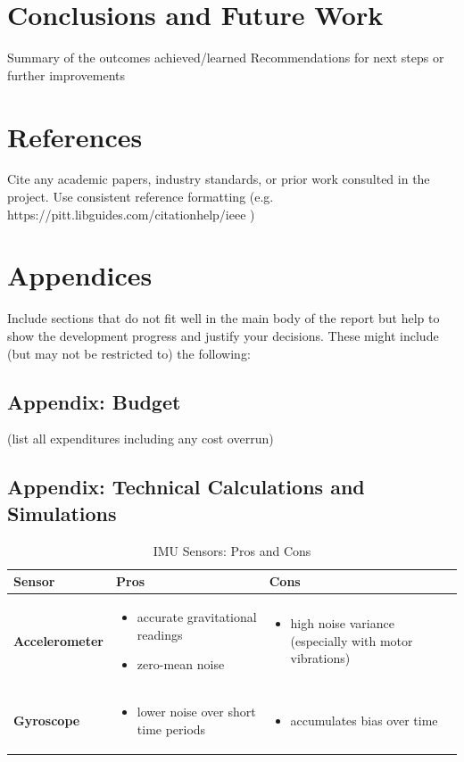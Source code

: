 \documentclass{article}
\begin{document}
\section{Conclusions and Future Work}
Summary of the outcomes achieved/learned
Recommendations for next steps or further improvements


\section{References}
Cite any academic papers, industry standards, or prior work consulted in the project. Use consistent reference
formatting (e.g. https://pitt.libguides.com/citationhelp/ieee )


\section{Appendices}
Include sections that do not fit well in the main body of the report but help to show the development progress and justify your decisions. These might include (but may not be restricted to) the following:
\subsection{Appendix: Budget} (list all expenditures including any cost overrun)

\subsection{Appendix: Technical Calculations and Simulations}

\begin{table}[H]
    \centering
    \caption{IMU Sensors: Pros and Cons}
    \label{tab:imu_sensors}
    \begin{tabularx}{\textwidth}{|l|X|X|}
    \hline
    \textbf{Sensor} & \textbf{Pros} & \textbf{Cons} \\
    \hline
    \textbf{Accelerometer} &
    \begin{itemize}
        \item accurate gravitational readings
        \item zero-mean noise
    \end{itemize} &
    \begin{itemize}
        \item high noise variance (especially with motor vibrations)
    \end{itemize} \\
    \hline
    \textbf{Gyroscope} &
    \begin{itemize}
        \item lower noise over short time periods
    \end{itemize} &
    \begin{itemize}
        \item accumulates bias over time
    \end{itemize} \\
    \hline
    \end{tabularx}
\end{table}
\end{document}

